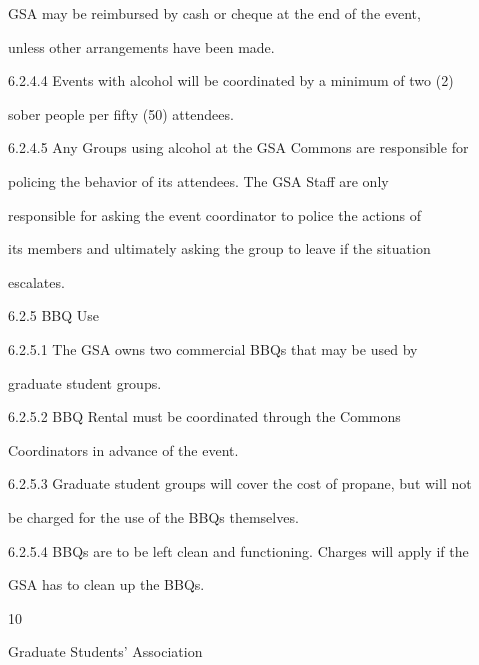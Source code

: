             GSA may be reimbursed by cash or  cheque at the end of the event,  

            unless other arrangements have been made.  

  

6.2.4.4   Events with alcohol will be coordinated by a minimum of  two (2)  

            sober people per fifty (50) attendees.   

  

6.2.4.5  Any Groups using alcohol at the GSA Commons are responsible for  

            policing  the  behavior  of  its  attendees.  The  GSA  Staff  are  only  

            responsible for asking the event coordinator to police the actions of  

            its members and ultimately asking the group to leave if the situation  

            escalates.   

  

  

         6.2.5  BBQ Use   

  

6.2.5.1   The  GSA  owns  two  commercial  BBQs  that  may  be  used  by  

            graduate student groups.   

  

6.2.5.2   BBQ          Rental      must       be    coordinated         through        the    Commons  

            Coordinators in advance of the event.   

  

6.2.5.3   Graduate student groups will cover the cost of propane, but will not  

            be charged for the use of the BBQs themselves.   

  

6.2.5.4   BBQs are to be left clean and functioning. Charges will apply if the  

            GSA   has   to   clean   up   the                        BBQs.   

                                                       10  

                                     

                                   Graduate Students’ Association  

